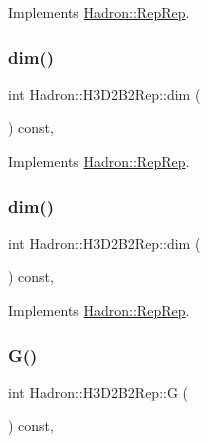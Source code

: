 Implements \mbox{\hyperlink{structHadron_1_1RepRep_a92c8802e5ed7afd7da43ccfd5b7cd92b}{Hadron\+::\+Rep\+Rep}}.

\mbox{\label{structHadron_1_1H3D2B2Rep_ad687c1e4069297e07ac09c437c3b5483}} 
\subsubsection{\texorpdfstring{dim()}{dim()}\hspace{0.1cm}{\footnotesize\ttfamily [2/3]}}
{\footnotesize\ttfamily int Hadron\+::\+H3\+D2\+B2\+Rep\+::dim (\begin{DoxyParamCaption}{ }\end{DoxyParamCaption}) const\hspace{0.3cm}{\ttfamily [inline]}, {\ttfamily [virtual]}}



Implements \mbox{\hyperlink{structHadron_1_1RepRep_a92c8802e5ed7afd7da43ccfd5b7cd92b}{Hadron\+::\+Rep\+Rep}}.

\mbox{\label{structHadron_1_1H3D2B2Rep_ad687c1e4069297e07ac09c437c3b5483}} 
\subsubsection{\texorpdfstring{dim()}{dim()}\hspace{0.1cm}{\footnotesize\ttfamily [3/3]}}
{\footnotesize\ttfamily int Hadron\+::\+H3\+D2\+B2\+Rep\+::dim (\begin{DoxyParamCaption}{ }\end{DoxyParamCaption}) const\hspace{0.3cm}{\ttfamily [inline]}, {\ttfamily [virtual]}}



Implements \mbox{\hyperlink{structHadron_1_1RepRep_a92c8802e5ed7afd7da43ccfd5b7cd92b}{Hadron\+::\+Rep\+Rep}}.

\mbox{\label{structHadron_1_1H3D2B2Rep_a99a41bf1ea4b0ac1918c75c46479fb5e}} 
\subsubsection{\texorpdfstring{G()}{G()}\hspace{0.1cm}{\footnotesize\ttfamily [1/2]}}
{\footnotesize\ttfamily int Hadron\+::\+H3\+D2\+B2\+Rep\+::G (\begin{DoxyParamCaption}{ }\end{DoxyParamCaption}) const\hspace{0.3cm}{\ttfamily [inline]}, {\ttfamily [virtual]}}

